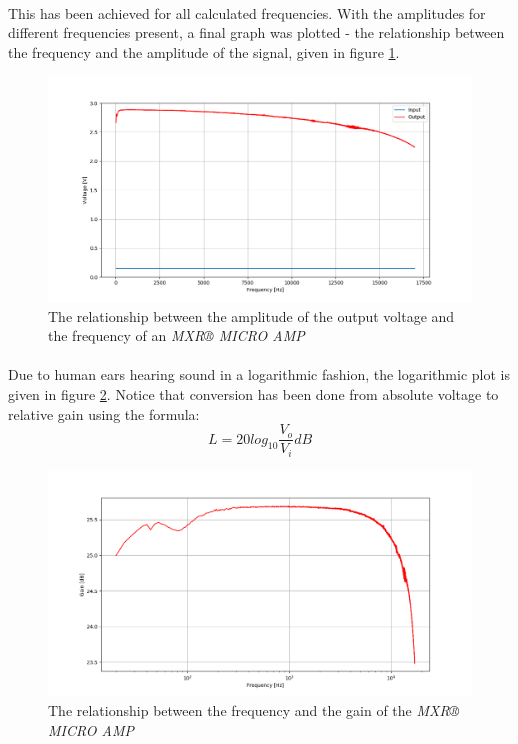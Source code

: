 \documentclass[a4paper, 12pt]{article}
\begin{document}
\paragraph*{}
This has been achieved for all calculated frequencies. With the amplitudes 
for different frequencies present, a final graph was plotted - the 
relationship between the frequency and the amplitude of the signal, given in 
figure \ref{fig:freq-response-v-lin}.
\begin{figure}[ht]
	\centering
	\includegraphics[width=\textwidth]{img/freq-response-v-lin}
	\caption{The relationship between the amplitude of the output voltage and 
	the frequency of an \textit{MXR® MICRO AMP}}
	\label{fig:freq-response-v-lin}
\end{figure}

\paragraph*{}
Due to human ears hearing sound in a logarithmic fashion, the logarithmic plot 
is given in figure \ref{fig:freq-response-db-log}. Notice that conversion has 
been done from absolute voltage to relative gain using the formula:
$$L = 20log_{10}\frac{V_o}{V_i} \si{dB}$$
\begin{figure}[ht]
	\centering
	\includegraphics[width=\textwidth]{img/freq-response-db-log}
	\caption{The relationship between the frequency and the gain of the 
	\textit{MXR® MICRO AMP}}
	\label{fig:freq-response-db-log}
\end{figure}
\end{document}
